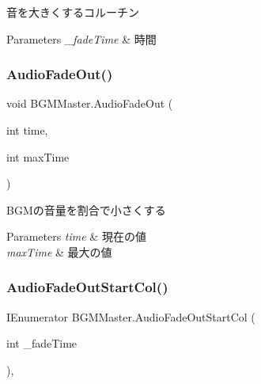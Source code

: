 音を大きくするコルーチン 


\begin{DoxyParams}{Parameters}
{\em \+\_\+fade\+Time} & 時間\\
\hline
\end{DoxyParams}
\mbox{\label{class_b_g_m_master_a5f4ad48af3ae8c81032d12d2e9dbc088}} 
\subsubsection{\texorpdfstring{Audio\+Fade\+Out()}{AudioFadeOut()}}
{\footnotesize\ttfamily void B\+G\+M\+Master.\+Audio\+Fade\+Out (\begin{DoxyParamCaption}\item[{int}]{time,  }\item[{int}]{max\+Time }\end{DoxyParamCaption})\hspace{0.3cm}{\ttfamily [inline]}}



B\+G\+Mの音量を割合で小さくする 


\begin{DoxyParams}{Parameters}
{\em time} & 現在の値\\
\hline
{\em max\+Time} & 最大の値\\
\hline
\end{DoxyParams}
\mbox{\label{class_b_g_m_master_a6807a80ef8801c30fecfd4ea7e97bc7c}} 
\subsubsection{\texorpdfstring{Audio\+Fade\+Out\+Start\+Col()}{AudioFadeOutStartCol()}}
{\footnotesize\ttfamily I\+Enumerator B\+G\+M\+Master.\+Audio\+Fade\+Out\+Start\+Col (\begin{DoxyParamCaption}\item[{int}]{\+\_\+fade\+Time }\end{DoxyParamCaption})\hspace{0.3cm}{\ttfamily [inline]}, {\ttfamily [private]}}



